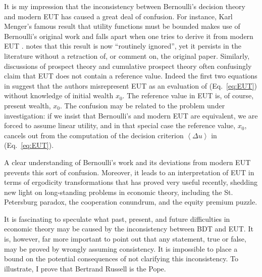 \documentclass[final]{ectaart}
\newcommand{\ave}[1]{\left\langle#1 \right\rangle}
\newcommand{\eref}[1]{(Eq.~\ref{eq:#1})}
\newcommand{\Du}{\Delta u}
\theoremstyle{plain}
\begin{document}
It is my impression that the inconsistency between Bernoulli's decision theory and modern EUT has caused a great deal of confusion. For instance, Karl Menger's famous result that utility functions must be bounded \citep{Menger1934} makes use of Bernoulli's original work and falls apart when one tries to derive it from modern EUT \citep{Peters2011c,PetersGell-Mann2016}.  \citet[p.~5]{Campbell2017} notes that this result is now ``routinely ignored'', yet it persists in the literature without a retraction of, or comment on, the original paper. Similarly, discussions of prospect theory and cumulative prospect theory often confusingly claim that EUT does not contain a reference value. Indeed the first two equations in \citep[pp. 263--264]{KahnemanTversky1979} suggest that the authors misrepresent EUT as an evaluation of \eref{EUT} without knowledge of initial wealth $x_0$. The reference value in EUT is, of course, present wealth, $x_0$. 
The confusion may be related to the problem under investigation: if we insist that Bernoulli's and modern EUT are equivalent, we are forced to assume linear utility, and in that special case the reference value, $x_0$, cancels out from the computation of the decision criterion $\ave{\Du}$ in \eref{EUT}.

A clear understanding of Bernoulli's work and its deviations from modern EUT prevents this sort of confusion. Moreover, it leads to an interpretation of EUT in terms of ergodicity transformations that has proved very useful recently, shedding new light on long-standing problems in economic theory, including the St. Petersburg paradox, the cooperation conundrum, and the equity premium puzzle.



\newpage


It is fascinating to speculate what past, present, and future difficulties in economic theory may be caused by the inconsistency between BDT and EUT. It is, however, far more important to point out that any statement, true or false, may be proved by wrongly assuming consistency. It is impossible to place a bound on the potential consequences of not clarifying this inconsistency. To illustrate, I prove that Bertrand Russell is the Pope.
\end{document}
